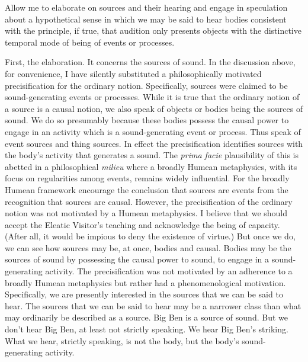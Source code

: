 Allow me to elaborate on sources and their hearing and engage in speculation about a hypothetical sense in which we may be said to hear bodies consistent with the principle, if true, that audition only presents objects with the distinctive temporal mode of being of events or processes.

First, the elaboration. It concerns the sources of sound. In the discussion above, for convenience, I have silently substituted a philosophically motivated precisification for the ordinary notion. Specifically, sources were claimed to be sound-generating events or processes. While it is true that the ordinary notion of a source is a causal notion, we also speak of objects or bodies being the sources of sound. We do so presumably because these bodies possess the causal power to engage in an activity which is a sound-generating event or process. Thus \citet{Casati:2013ca} speak of event sources and thing sources. In effect the precisification identifies sources with the body's activity that generates a sound. The \emph{prima facie} plausibility of this is abetted in a philosophical \emph{milieu} where a broadly Humean metaphysics, with its focus on regularities among events, remains widely influential. For the broadly Humean framework encourage the conclusion that sources are events from the recognition that sources are causal. However, the precisification of the ordinary notion was not motivated by a Humean metaphysics. I believe that we should accept the Eleatic Visitor's teaching and acknowledge the being of capacity. (After all, it would be impious to deny the existence of virtue.) But once we do, we can see how sources may be, at once, bodies and causal. Bodies may be the sources of sound by possessing the causal power to sound, to engage in a sound-generating activity. The precisification was not motivated by an adherence to a broadly Humean metaphysics but rather had a phenomenological motivation. Specifically, we are presently interested in the sources that we can be said to hear. The sources that we can be said to hear may be a narrower class than what may ordinarily be described as a source. Big Ben is a source of sound. But we don't hear Big Ben, at least not strictly speaking. We hear Big Ben's striking. What we hear, strictly speaking, is not the body, but the body's sound-generating activity. 


